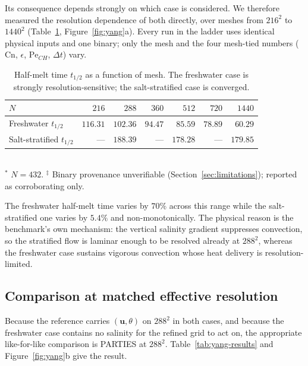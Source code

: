 \documentclass[review,12pt]{elsarticle}
\newcommand{\uvec}{\mathbf{u}}
\newcommand{\Pech}{\mathrm{Pe}_{CH}}
\begin{document}
Its consequence depends strongly on which case is considered. We therefore
measured the resolution dependence of both directly, over meshes from $216^2$ to
$1440^2$ (Table~\ref{tab:ladder}, Figure~\ref{fig:yang}a). Every run in the
ladder uses identical physical inputs and one binary; only the mesh and the four
mesh-tied numbers ($\mathrm{Cn}$, $\epsilon$, $\Pech$, $\Delta t$) vary.

\begin{table}[H]
\centering
\caption{Half-melt time $t_{1/2}$ as a function of mesh. The freshwater case is
strongly resolution-sensitive; the salt-stratified case is converged.}
\label{tab:ladder}
\begin{tabular}{l r r r r r r}
\toprule
$N$ & $216$ & $288$ & $360$ & $512$ & $720$ & $1440$ \\
\midrule
Freshwater $t_{1/2}$ & $116.31$ & $102.36$ & $94.47$ & $85.59$ & $78.89$ & $60.29$ \\
Salt-stratified $t_{1/2}$ & --- & $188.39$ & --- & $178.28$\rlap{$^{\ast}$} & --- & $179.85$\rlap{$^{\ddagger}$} \\
\bottomrule
\end{tabular}
\\[2pt]
\footnotesize $^{\ast}$ $N=432$. \quad
$^{\ddagger}$ Binary provenance unverifiable (Section~\ref{sec:limitations});
reported as corroborating only.
\end{table}

The freshwater half-melt time varies by $70\%$ across this range while the
salt-stratified one varies by $5.4\%$ and non-monotonically. The physical reason
is the benchmark's own mechanism: the vertical salinity gradient suppresses
convection, so the stratified flow is laminar enough to be resolved already at
$288^2$, whereas the freshwater case sustains vigorous convection whose heat
delivery is resolution-limited.

\subsection{Comparison at matched effective resolution}

Because the reference carries $(\uvec,\theta)$ on $288^2$ in both cases, and
because the freshwater case contains no salinity for the refined grid to act on,
the appropriate like-for-like comparison is PARTIES at $288^2$.
Table~\ref{tab:yang-results} and Figure~\ref{fig:yang}b give the result.
\end{document}
